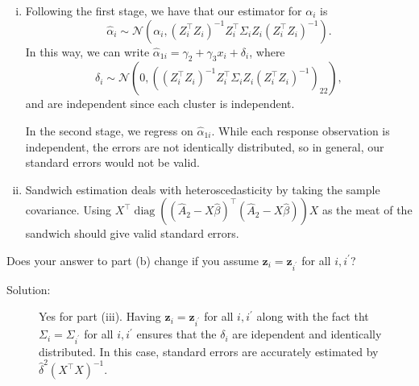\documentclass[11pt, letterpaper]{article}
\newcommand{\bz}{{\bm z}}
\begin{document}
\begin{enumerate}[(a)]
\begin{description}
\begin{enumerate}[i.]
    If we use the usual covariance matrix estimate that assumes independence, we
    would not get valid standard errors, however, unless the data were actually
    independent.
  \item Following the first stage, we have that our estimator for $\alpha_i$ is
    \begin{equation}
      \hat{\alpha}_i \sim \mathcal{N}\left(
        \alpha_i, \left(Z_i^\intercal Z_i\right)^{-1}Z_i^\intercal\Sigma_i Z_i\left(Z_i^\intercal Z_i\right)^{-1}
      \right).
    \end{equation}
    In this way, we can write
    $\hat{\alpha}_{1i} = \gamma_2 + \gamma_3x_i + \delta_i$, where
    $$\delta_i \sim \mathcal{N}\left(0, \left(\left(Z_i^\intercal
          Z_i\right)^{-1}Z_i^\intercal\Sigma_i Z_i\left(Z_i^\intercal
          Z_i\right)^{-1}\right)_{22}\right),$$ and are independent since each
    cluster is independent.
    
    In the second stage, we regress on $\hat{\alpha}_{1i}$. While each response
    observation is independent, the errors are not identically distributed, so
    in general, our standard errors would not be valid.
  \item Sandwich estimation deals with heteroscedasticity by taking the sample
    covariance. Using $X^\intercal\operatorname{diag}\left(
      \left(\hat{A}_2 - X\hat{\beta}\right)^\intercal
      \left(\hat{A}_2 - X\hat{\beta}\right)
    \right)X$ as the meat of
    the sandwich should give valid standard errors.
  \end{enumerate}
\end{description}

{\em \item Does your answer to part (b) change if you assume $\bz_i = \bz_{i^\prime}$ for all $i,i^\prime$?}

\begin{description}
\item[Solution:] Yes for part (iii). Having $\bz_i = \bz_{i^\prime}$ for all
  $i,i^\prime$ along with the fact tht $\Sigma_i = \Sigma_{i^\prime}$ for all
  $i,i^\prime$ ensures that the $\delta_i$ are idependent and identically
  distributed. In this case, standard errors are accurately estimated by
  $\hat{\delta}^2\left(X^\intercal X\right)^{-1}$.
\end{description}

\end{enumerate}
\end{document}
